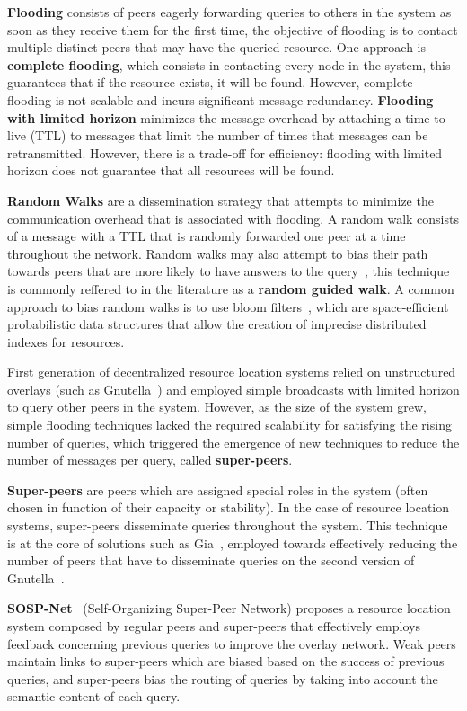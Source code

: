 \textbf{Flooding} consists of peers eagerly forwarding queries to others in the system as soon as they receive them for the first time, the objective of flooding is to contact multiple distinct peers that may have the queried resource. One approach is \textbf{complete flooding}, which consists in contacting every node in the system, this guarantees that if the resource exists, it will be found. However, complete flooding is not scalable and incurs significant message redundancy. \textbf{Flooding with limited horizon} minimizes the message overhead by attaching a time to live (TTL) to messages that limit the number of times that messages can be retransmitted. However, there is a trade-off for efficiency: flooding with limited horizon does not guarantee that all resources will be found. 

\textbf{Random Walks} are a dissemination strategy that attempts to minimize the communication overhead that is associated with flooding. A random walk consists of a message with a TTL that is randomly forwarded one peer at a time throughout the network. Random walks may also attempt to bias their path towards peers that are more likely to have answers to the query~\cite{1022239}, this technique is commonly reffered to in the literature as a \textbf{random guided walk}. A common approach to bias random walks is to use bloom filters~\cite{5751342}, which are space-efficient probabilistic data structures that allow the creation of imprecise distributed indexes for resources.

First generation of decentralized resource location systems relied on unstructured overlays (such as Gnutella~\cite{gnutella_gtk}) and employed simple broadcasts with limited horizon to query other peers in the system. However, as the size of the system grew, simple flooding techniques lacked the required scalability for satisfying the rising number of queries, which triggered the emergence of new techniques to reduce the number of messages per query, called \textbf{super-peers}. 

\textbf{Super-peers} are peers which are assigned special roles in the system (often chosen in function of their capacity or stability). In the case of resource location systems, super-peers disseminate queries throughout the system. This technique is at the core of solutions such as Gia~\cite{Chawathe2003}, employed towards effectively reducing the number of peers that have to disseminate queries on the second version of Gnutella~\cite{gnutella_gtk}. 

\textbf{SOSP-Net}~\cite{garbacki2007optimizing} (Self-Organizing Super-Peer Network) proposes a resource location system composed by regular peers and super-peers that effectively employs feedback concerning previous queries to improve the overlay network. Weak peers maintain links to super-peers which are biased based on the success of previous queries, and super-peers bias the routing of queries by taking into account the semantic content of each query. 

